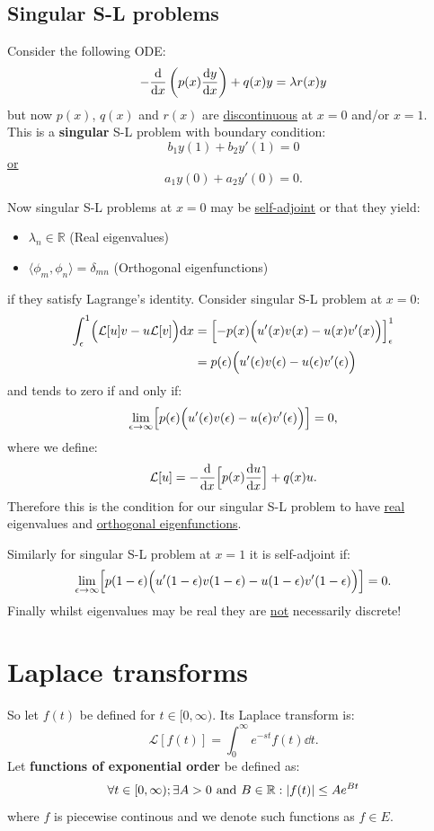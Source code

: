 \documentclass{article}
\begin{document}
\subsection{Singular S-L problems}
Consider the following ODE:
$$-\dv{x}\left(p(x)\dv{y}{x}\right)+q(x)y=\lambda r(x)y$$
but now $p(x)$, $q(x)$ and $r(x)$ are \underline{discontinuous}
at $x=0$ and/or $x=1$. \\
This is a \textbf{singular} S-L problem with boundary condition:
$$b_1 y(1)+b_2 y'(1)=0$$
\underline{or}
$$a_1 y(0)+a_2 y'(0)=0.$$

Now singular S-L problems at $x=0$ may be \underline{self-adjoint} or that they yield:
\begin{itemize}
    \item $\lambda_n\in\mathbb{R}$ (Real eigenvalues)
    \item $\langle \phi_m,\phi_n \rangle=\delta_{mn}$
    (Orthogonal eigenfunctions)
\end{itemize}
if they satisfy Lagrange's identity. Consider singular S-L problem at $x=0$:
\begin{align*}
    \int_{\epsilon}^{1}\Bigl(\mathcal{L}[u]v
    -u\mathcal{L}[v]\Bigr)\dd x
    &=\Bigl[-p(x)
    \Bigl(u'(x)v(x)-u(x)v'(x)\Bigr)\Bigr]_{\epsilon}^{1} \\
    &=p(\epsilon)
    \Bigl(u'(\epsilon)v(\epsilon)-u(\epsilon)v'(\epsilon)\Bigr)
\end{align*}
and tends to zero if and only if:
$$\lim_{\epsilon\rightarrow\infty}
\Bigl[p(\epsilon)
\Bigl(u'(\epsilon)v(\epsilon)-u(\epsilon)v'(\epsilon)\Bigr)\Bigr]=0,$$
where we define:
$$\mathcal{L}[u]=-\dv{x}\Bigl[p(x)\dv{u}{x}\Bigr]+q(x)u.$$
Therefore this is the condition for our singular S-L
problem to have \underline{real} eigenvalues and 
\underline{orthogonal eigenfunctions}.

Similarly for singular S-L problem at $x=1$ it is self-adjoint if:
$$\lim_{\epsilon\rightarrow\infty}
\Bigl[p(1-\epsilon)
\Bigl(u'(1-\epsilon)v(1-\epsilon)-u(1-\epsilon)v'(1-\epsilon)\Bigr)\Bigr]=0.$$
Finally whilst eigenvalues may be real they are \underline{not}
necessarily discrete!

\newpage

\section{Laplace transforms}
So let $f(t)$ be defined for $t\in[0,\infty)$. Its Laplace transform is:
$$\mathcal{L}[f(t)]=\int_{0}^{\infty}e^{-st}f(t)\dd t.$$
Let \textbf{functions of exponential order} be defined as:
$$\forall t\in[0,\infty);\exists A>0\hspace{0.05in}\text{and}\hspace{0.05in}
B\in\mathbb{R}:|f(t)|\leq Ae^{Bt}$$
where $f$ is piecewise continous and
we denote such functions as $f\in E$.
\end{document}
